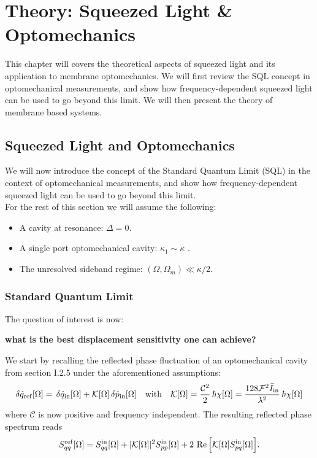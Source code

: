 \chapter{Theory: Squeezed Light \& Optomechanics}
This chapter will covers the theoretical aspects of squeezed light and its application to membrane optomechanics. We will first review the SQL concept in optomechanical measurements, and show how frequency-dependent squeezed light can be used to go beyond this limit. We will then present the theory of membrane based systems. 
\minitoc
\newpage


\section{Squeezed Light and Optomechanics}

We will now introduce the concept of the Standard Quantum Limit (SQL) in the context of optomechanical measurements, and show how frequency-dependent squeezed light can be used to go beyond this limit. \\ 

For the rest of this section we will assume the following:
\begin{itemize}
  \item A cavity at resonance: $\Delta=0$.
  \item A single port optomechanical cavity: $\kappa_1 \sim \kappa$ .
  \item The unresolved sideband regime: $(\Omega, \Omega_m) \ll \kappa/2$.
\end{itemize}
\subsection{Standard Quantum Limit}
The question of interest is now:
\begin{center}
  \textbf{what is the best displacement sensitivity one can achieve?}
\end{center}  

We start by recalling the reflected phase fluctuation of an optomechanical cavity from section I.2.5 under the aforementioned assumptions:
\begin{equation*}
\delta \hat{q}_{\mathrm{ref}}[\Omega] = \, \delta \hat{q}_{\mathrm{in}}[\Omega]  + \mathcal{K}[\Omega]\, \delta \hat{p}_{\mathrm{in}}[\Omega] \quad  \text{with} \quad \mathcal{K}[\Omega] = \frac{\mathcal{C}^2}{2}   \,\hbar  \chi[\Omega] =  \dfrac{128 \mathcal{F}^2 \bar I_{\rm in}}{\lambda^2}  \,  \hbar  \chi[\Omega]
\end{equation*}
where $\mathcal{C}$ is now positive and frequency independent. The resulting reflected phase spectrum reads
\begin{equation*}
  S_{qq}^{\mathrm{ref}}[\Omega] = S_{qq}^{\rm in}[\Omega] + |\mathcal{K}[\Omega]|^2 S_{pp}^{\rm in}[\Omega] + 2 \, \Re\Big[ \mathcal{K}[\Omega] S_{pq}^{\rm in}[\Omega]\Big].
\end{equation*}

